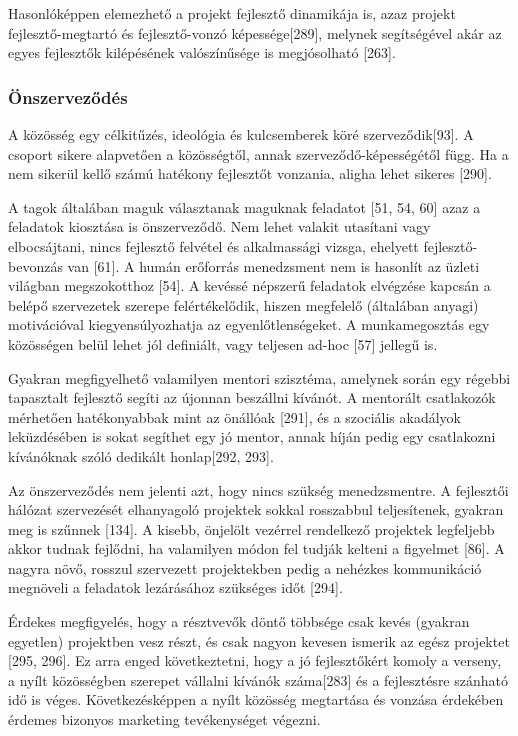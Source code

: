 \documentclass[12pt,magyar,a4paper,oneside]{scrreprt}
\begin{document}
Hasonlóképpen elemezhető a projekt fejlesztő dinamikája is, azaz projekt
fejlesztő-megtartó és fejlesztő-vonzó képessége{[}289{]}, melynek
segítségével akár az egyes fejlesztők kilépésének valószínűsége is
megjósolható {[}263{]}.

\hypertarget{uxf6nszervezux151duxe9s}{%
\subsubsection{Önszerveződés}\label{uxf6nszervezux151duxe9s}}

A közösség egy célkitűzés, ideológia és kulcsemberek köré
szerveződik{[}93{]}. A csoport sikere alapvetően a közösségtől, annak
szerveződő-képességétől függ. Ha a nem sikerül kellő számú hatékony
fejlesztőt vonzania, aligha lehet sikeres {[}290{]}.

A tagok általában maguk választanak maguknak feladatot {[}51, 54, 60{]}
azaz a feladatok kiosztása is önszerveződő. Nem lehet valakit utasítani
vagy elbocsájtani, nincs fejlesztő felvétel és alkalmassági vizsga,
ehelyett fejlesztő-bevonzás van {[}61{]}. A humán erőforrás menedzsment
nem is hasonlít az üzleti világban megszokotthoz {[}54{]}. A kevéssé
népszerű feladatok elvégzése kapcsán a belépő szervezetek szerepe
felértékelődik, hiszen megfelelő (általában anyagi) motivációval
kiegyensúlyozhatja az egyenlőtlenségeket. A munkamegosztás egy
közösségen belül lehet jól definiált, vagy teljesen ad-hoc {[}57{]}
jellegű is.

Gyakran megfigyelhető valamilyen mentori szisztéma, amelynek során egy
régebbi tapasztalt fejlesztő segíti az újonnan beszállni kívánót. A
mentorált csatlakozók mérhetően hatékonyabbak mint az önállóak
{[}291{]}, és a szociális akadályok leküzdésében is sokat segíthet egy
jó mentor, annak híján pedig egy csatlakozni kívánóknak szóló dedikált
honlap{[}292, 293{]}.

Az önszerveződés nem jelenti azt, hogy nincs szükség menedzsmentre. A
fejlesztői hálózat szervezését elhanyagoló projektek sokkal rosszabbul
teljesítenek, gyakran meg is szűnnek {[}134{]}. A kisebb, önjelölt
vezérrel rendelkező projektek legfeljebb akkor tudnak fejlődni, ha
valamilyen módon fel tudják kelteni a figyelmet {[}86{]}. A nagyra növő,
rosszul szervezett projektekben pedig a nehézkes kommunikáció megnöveli
a feladatok lezárásához szükséges időt {[}294{]}.

Érdekes megfigyelés, hogy a résztvevők döntő többsége csak kevés
(gyakran egyetlen) projektben vesz részt, és csak nagyon kevesen ismerik
az egész projektet {[}295, 296{]}. Ez arra enged következtetni, hogy a
jó fejlesztőkért komoly a verseny, a nyílt közösségben szerepet vállalni
kívánók száma{[}283{]} és a fejlesztésre szánható idő is véges.
Következésképpen a nyílt közösség megtartása és vonzása érdekében
érdemes bizonyos marketing tevékenységet végezni.
\end{document}

